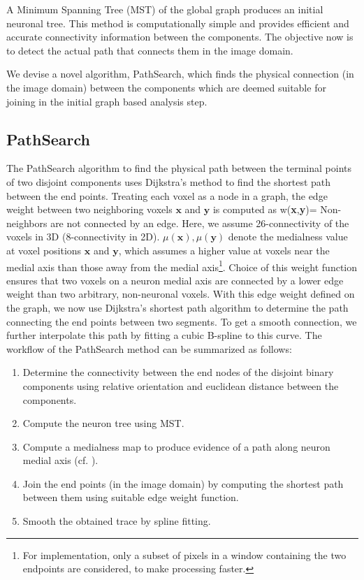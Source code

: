 A Minimum Spanning Tree (MST) of the global graph produces an initial neuronal tree. This method is computationally simple and provides efficient and accurate connectivity information between the components. The objective now is to detect the actual path that connects them in the image domain.

We devise a novel algorithm, PathSearch, which finds the  physical connection (in the image domain) between the components which are deemed suitable for joining in the initial graph based analysis step. 

\subsection{PathSearch}

The PathSearch algorithm to find the physical path between the terminal points of two disjoint components uses Dijkstra's method \cite{dijkstra1959note} to find the shortest path between the end points. Treating each voxel as a node in a graph, the edge weight between two neighboring voxels $\textbf{x}$ and $\textbf{y}$ is computed as
\bea
w(\textbf{x},\textbf{y})=
\label{eq:pathsearch}
\eea
Non-neighbors are not connected by an edge. Here, we assume 26-connectivity of the voxels in 3D (8-connectivity in 2D). $\mu(\textbf{x}),\mu(\textbf{y})$ denote the medialness value at voxel positions $\textbf{x}$ and $\textbf{y}$, which assumes a higher value at voxels near the medial axis than those away from the medial axis\cite{mukherjee_medialness}\footnote{For implementation, only a subset of pixels in a window containing the two endpoints are considered, to make processing faster.}. Choice of this weight function ensures that two voxels on a neuron medial axis are connected by a lower edge weight than two arbitrary, non-neuronal voxels. With this edge weight defined on the graph, we now use Dijkstra's shortest path algorithm \cite{dijkstra1959note} to determine the path connecting the end points between two segments. To get a smooth connection, we further interpolate this path by fitting a cubic B-spline to this curve. The workflow of the PathSearch method can be summarized as follows:
\begin{enumerate}
\item Determine the  connectivity between the end nodes of the disjoint binary components using relative orientation and euclidean distance between the components.
\item Compute the neuron tree using MST.
\item Compute a medialness map to produce evidence of a path along neuron medial axis (cf. \cite{mukherjee_medialness}).
\item Join the end points (in the image domain) by computing the shortest path between them using suitable edge weight function.
\item Smooth the obtained trace by spline fitting.
\end{enumerate}

